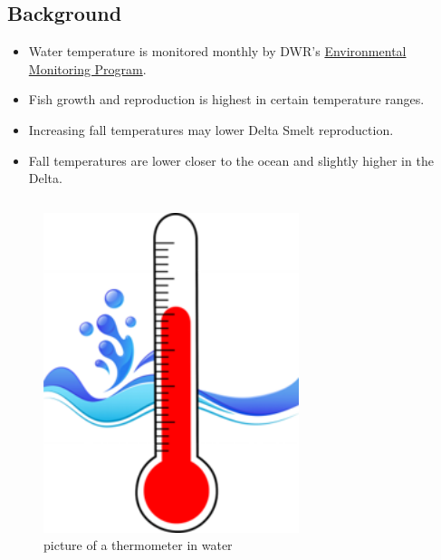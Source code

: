 \documentclass[
]{book}
\providecommand{\tightlist}{%
  \setlength{\itemsep}{0pt}\setlength{\parskip}{0pt}}
\begin{document}
\begin{columns-nocenter}

\begin{column}

\hypertarget{background-1}{%
\subsection{Background}\label{background-1}}

\begin{itemize}
\tightlist
\item
  Water temperature is monitored monthly by DWR's \href{https://emp.baydeltalive.com/wiki/12297}{Environmental Monitoring Program}.
\item
  Fish growth and reproduction is highest in certain temperature ranges.
\item
  Increasing fall temperatures may lower Delta Smelt reproduction.
\item
  Fall temperatures are lower closer to the ocean and slightly higher in the Delta.
\end{itemize}

\end{column}

\begin{column}

\begin{figure}

{\centering \includegraphics[width=2.94in]{figures/thermometer} 

}

\caption{picture of a thermometer in water}\label{fig:unnamed-chunk-100}
\end{figure}

\end{column}

\end{columns-nocenter}
\end{document}

